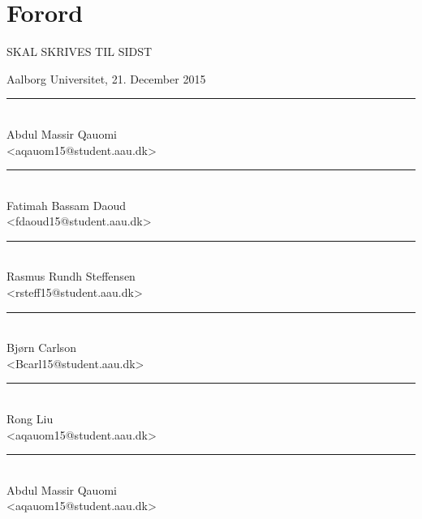 \chapter{Forord}
\label{chap:Forord}

SKAL SKRIVES TIL SIDST

\vspace{\baselineskip}\hfill Aalborg Universitet, 21. December 2015
\vfill

\noindent
\begin{minipage}[b]{0.45\textwidth}
 \centering
 \rule{\textwidth}{0.5pt}\\
  Abdul Massir Qauomi\\
 {\footnotesize <aqauom15@student.aau.dk>}
\end{minipage}
%
\hfill
%
\begin{minipage}[b]{0.45\textwidth}
 \centering
 \rule{\textwidth}{0.5pt}\\
  Fatimah Bassam Daoud\\
 {\footnotesize <fdaoud15@student.aau.dk>}
\end{minipage}
%
\vspace{3\baselineskip}

\noindent
\begin{minipage}[b]{0.45\textwidth}
 \centering
 \rule{\textwidth}{0.5pt}\\
  Rasmus Rundh Steffensen\\
 {\footnotesize <rsteff15@student.aau.dk>}
\end{minipage}
%
\hfill
%
\begin{minipage}[b]{0.45\textwidth}
 \centering
 \rule{\textwidth}{0.5pt}\\
  Bjørn Carlson\\
 {\footnotesize <Bcarl15@student.aau.dk>}
\end{minipage}
\vspace{3\baselineskip}

\noindent
\begin{minipage}[b]{0.45\textwidth}
 \centering
 \rule{\textwidth}{0.5pt}\\
  Rong Liu\\
 {\footnotesize <aqauom15@student.aau.dk>}
\end{minipage}
%
\hfill
%
\begin{minipage}[b]{0.45\textwidth}
 \centering
 \rule{\textwidth}{0.5pt}\\
  Abdul Massir Qauomi\\
 {\footnotesize <aqauom15@student.aau.dk>}
\end{minipage}
\vspace{3\baselineskip}
